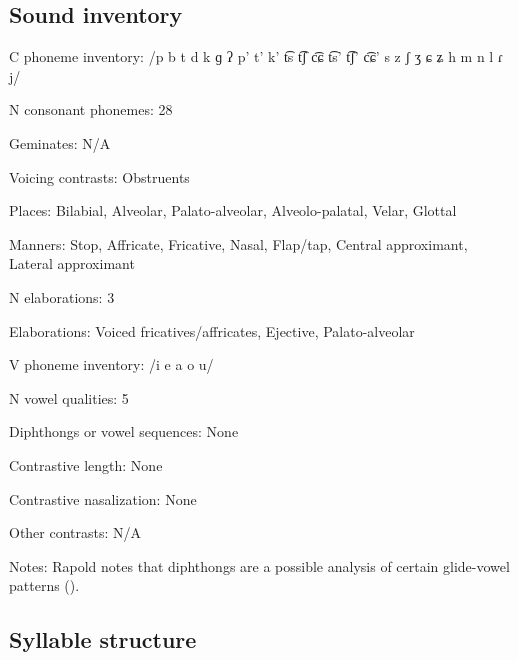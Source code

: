{\subsection*{Sound inventory}
\begin{appendixdesc}

\item[C phoneme inventory:] /p b t d k ɡ ʔ p’ t’ k’ t͡s t͡ʃ c͡ɕ t͡s’ t͡ʃ’ c͡ɕ’ s z ʃ ʒ ɕ ʑ h m n l ɾ j/

\item[N consonant phonemes:] 28

\item[Geminates:] N/A

\item[Voicing contrasts:] Obstruents

\item[Places:] Bilabial, Alveolar, Palato-alveolar, Alveolo-palatal, Velar, Glottal

\item[Manners:] Stop, Affricate, Fricative, Nasal, Flap/tap, Central approximant, Lateral approximant

\item[N elaborations:] 3

\item[Elaborations:] Voiced fricatives/affricates, Ejective, Palato-alveolar

\item[V phoneme inventory:] /i e a o u/

\item[N vowel qualities:] 5

\item[Diphthongs or vowel sequences:] None

\item[Contrastive length:] None

\item[Contrastive nasalization:] None

\item[Other contrasts:] N/A

\item[Notes:] Rapold notes that diphthongs are a possible analysis of certain glide-vowel patterns (\citeyear[100--102]{Rapold2006}).
\end{appendixdesc}
\subsection*{Syllable structure}
\begin{appendixdesc}


\end{appendixdesc}}
